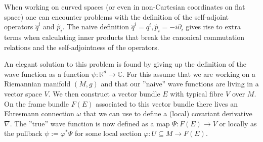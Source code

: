 	\begin{construct}
		When working on curved spaces (or even in non-Cartesian coordinates on flat space) one can encounter problems with the definition of the self-adjoint operators $\hat{q}^i$ and $\hat{p}_i$. The naive definition $\hat{q}^i = q^i, \hat{p}_i = -i\partial_i$ gives rise to extra terms when calculating inner products that break the canonical commutation relations and the self-adjointness of the operators.

		An elegant solution to this problem is found by giving up the definition of the wave function as a function $\psi:\mathbb{R}^d\rightarrow\mathbb{C}$. For this assume that we are working on a Riemannian manifold $(M, g)$ and that our ''naive'' wave functions are living in a vector space $V$. We then construct a vector bundle $E$ with typical fibre $V$ over $M$. On the frame bundle $F(E)$ associated to this vector bundle there lives an Ehresmann connection $\omega$ that we can use to define a (local) covariant derivative $\nabla$. The ''true'' wave function is now defined as a map $\Psi: F(E)\rightarrow V$ or locally as the pullback $\psi := \varphi^*\Psi$ for some local section $\varphi:U\subseteq M\rightarrow F(E)$.


\end{construct}
